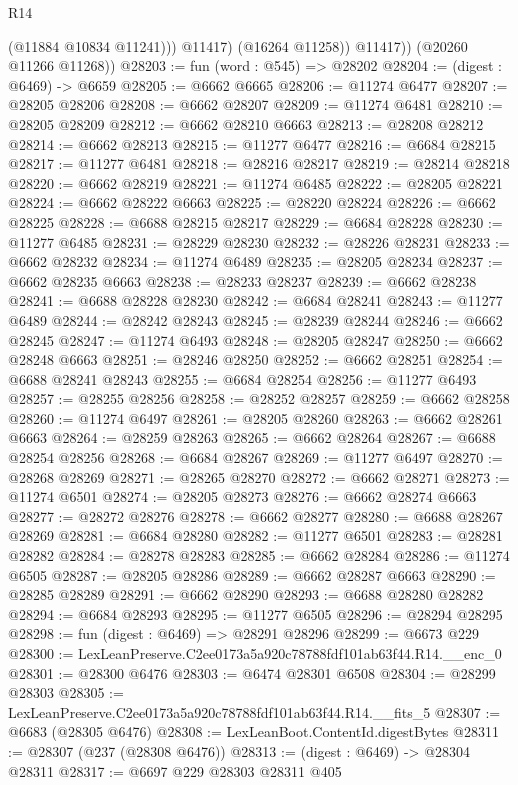 \begin{lexlean}{R14}
\begin{coremodule}
                  (@11884 @10834 @11241)))
              @11417)
            (@16264 @11258))
          @11417))
      (@20260 @11266 @11268))
@28203 := fun (word : @545) => @28202
@28204 := (digest : @6469) -> @6659
@28205 := @6662 @6665
@28206 := @11274 @6477
@28207 := @28205 @28206
@28208 := @6662 @28207
@28209 := @11274 @6481
@28210 := @28205 @28209
@28212 := @6662 @28210 @6663
@28213 := @28208 @28212
@28214 := @6662 @28213
@28215 := @11277 @6477
@28216 := @6684 @28215
@28217 := @11277 @6481
@28218 := @28216 @28217
@28219 := @28214 @28218
@28220 := @6662 @28219
@28221 := @11274 @6485
@28222 := @28205 @28221
@28224 := @6662 @28222 @6663
@28225 := @28220 @28224
@28226 := @6662 @28225
@28228 := @6688 @28215 @28217
@28229 := @6684 @28228
@28230 := @11277 @6485
@28231 := @28229 @28230
@28232 := @28226 @28231
@28233 := @6662 @28232
@28234 := @11274 @6489
@28235 := @28205 @28234
@28237 := @6662 @28235 @6663
@28238 := @28233 @28237
@28239 := @6662 @28238
@28241 := @6688 @28228 @28230
@28242 := @6684 @28241
@28243 := @11277 @6489
@28244 := @28242 @28243
@28245 := @28239 @28244
@28246 := @6662 @28245
@28247 := @11274 @6493
@28248 := @28205 @28247
@28250 := @6662 @28248 @6663
@28251 := @28246 @28250
@28252 := @6662 @28251
@28254 := @6688 @28241 @28243
@28255 := @6684 @28254
@28256 := @11277 @6493
@28257 := @28255 @28256
@28258 := @28252 @28257
@28259 := @6662 @28258
@28260 := @11274 @6497
@28261 := @28205 @28260
@28263 := @6662 @28261 @6663
@28264 := @28259 @28263
@28265 := @6662 @28264
@28267 := @6688 @28254 @28256
@28268 := @6684 @28267
@28269 := @11277 @6497
@28270 := @28268 @28269
@28271 := @28265 @28270
@28272 := @6662 @28271
@28273 := @11274 @6501
@28274 := @28205 @28273
@28276 := @6662 @28274 @6663
@28277 := @28272 @28276
@28278 := @6662 @28277
@28280 := @6688 @28267 @28269
@28281 := @6684 @28280
@28282 := @11277 @6501
@28283 := @28281 @28282
@28284 := @28278 @28283
@28285 := @6662 @28284
@28286 := @11274 @6505
@28287 := @28205 @28286
@28289 := @6662 @28287 @6663
@28290 := @28285 @28289
@28291 := @6662 @28290
@28293 := @6688 @28280 @28282
@28294 := @6684 @28293
@28295 := @11277 @6505
@28296 := @28294 @28295
@28298 := fun (digest : @6469) => @28291 @28296
@28299 := @6673 @229
@28300 := LexLeanPreserve.C2ee0173a5a920c78788fdf101ab63f44.R14.__enc_0
@28301 := @28300 @6476
@28303 := @6474 @28301 @6508
@28304 := @28299 @28303
@28305 := LexLeanPreserve.C2ee0173a5a920c78788fdf101ab63f44.R14.__fits_5
@28307 := @6683 (@28305 @6476)
@28308 := LexLeanBoot.ContentId.digestBytes
@28311 := @28307 (@237 (@28308 @6476))
@28313 := (digest : @6469) -> @28304 @28311
@28317 := @6697 @229 @28303 @28311 @405

\end{coremodule}
\end{lexlean}
